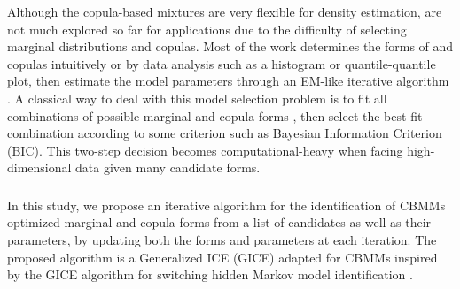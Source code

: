 Although the copula-based mixtures are very flexible for density estimation,  are not much explored so far for applications due to the difficulty of selecting marginal distributions and copulas.
Most of the work determines the forms of  and copulas intuitively or by data analysis such as a histogram or quantile-quantile plot, then estimate the model parameters through an EM-like iterative algorithm \cite{roy2014pair}. %
A classical way to deal with this model selection problem is to fit all combinations of possible marginal and copula forms , then select the best-fit combination according to some criterion such as Bayesian Information Criterion (BIC). %
This two-step decision becomes computational-heavy when facing high-dimensional data given many candidate forms.  

\subsubsection*{}

In this study, we propose an iterative algorithm for the identification of CBMMs  optimized marginal and copula forms from a list of candidates as well as their parameters, by updating both the forms and parameters at each iteration. The proposed algorithm is a Generalized ICE (GICE) 
\cite{pieczynski2007convergence}
adapted for CBMMs inspired by the GICE algorithm for switching hidden Markov model identification \cite{zheng2020semi, derrode2016unsupervised}.

